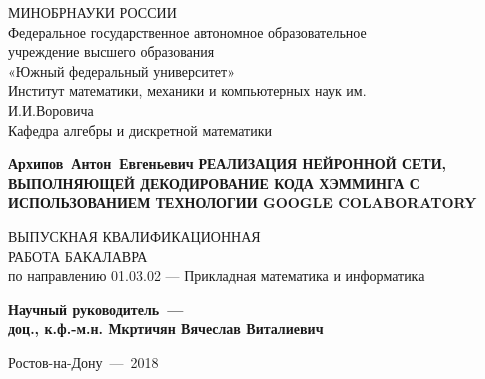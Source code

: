 \normalsize

\thispagestyle{empty}
\begin{titlepage}
\begin{center}

\vfill
МИНОБРНАУКИ РОССИИ\\
\vspace*{0.3cm}
Федеральное государственное автономное образовательное\\
учреждение высшего образования\\
«Южный федеральный университет»\\
\vspace*{0.3cm}
Институт математики, механики и компьютерных наук им.\\
И.И.Воровича\\
Кафедра алгебры и дискретной математики
\vfill

\bigskip

{\large\bf Архипов~Антон~Евгеньевич}
\vfill
{\large\bf РЕАЛИЗАЦИЯ НЕЙРОННОЙ СЕТИ, ВЫПОЛНЯЮЩЕЙ ДЕКОДИРОВАНИЕ КОДА ХЭММИНГА С ИСПОЛЬЗОВАНИЕМ ТЕХНОЛОГИИ GOOGLE COLABORATORY}

\fontsize{14}{16pt}\selectfont

\vfill
ВЫПУСКНАЯ КВАЛИФИКАЦИОННАЯ\\ РАБОТА БАКАЛАВРА\\
по направлению 01.03.02 — Прикладная математика и информатика
\vfill

{\bf Научный руководитель~---\\
доц., к.ф.-м.н. Мкртичян Вячеслав Виталиевич}

\vfill

\end{center}

\bigskip

\begin{center}
Ростов-на-Дону~---~2018
\end{center}

\end{titlepage} 